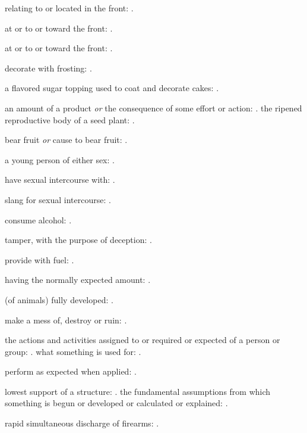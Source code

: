   relating to or located in the front: .

  at or to or toward the front: .

  at or to or toward the front: .

  decorate with frosting: .

  a flavored sugar topping used to coat and decorate cakes: .

  an amount of a product \textit{or} the consequence of some effort or action: . the ripened reproductive body of a seed plant: .

  bear fruit \textit{or} cause to bear fruit: .

  a young person of either sex: .

  have sexual intercourse with:   .

  slang for sexual intercourse: .

  consume alcohol: .

  tamper, with the purpose of deception: .

  provide with fuel: .

  having the normally expected amount: .

  (of animals) fully developed: .

  make a mess of, destroy or ruin: .

  the actions and activities assigned to or required or expected of a person or group: . what something is used for: .

  perform as expected when applied: .

  lowest support of a structure: . the fundamental assumptions from which something is begun or developed or calculated or explained: .

  rapid simultaneous discharge of firearms: .

